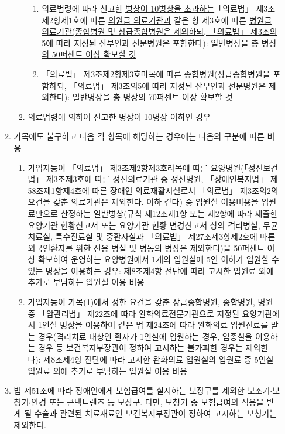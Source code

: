 \begin{enumerate}[1.]
\begin{enumerate}[가.]
\begin{enumerate}[(1)]
     		\begin{enumerate}[(가)]\tightlist
     		\item 의료법령에 따라 신고한 \uline{병상이 10병상을 초과하는}「의료법」 제3조제2항제1호에 따른 \uline{의원급 의료기관과} 같은 항 제3호에 따른 \uline{병원급 의료기관(종합병원 및 상급종합병원은 제외하되, 「의료법」 제3조의5에 따라 지정된 산부인과 전문병원은 포함한다)}: \uline{일반병상을 총 병상의 50퍼센트 이상 확보할 것}
     		\item 「의료법」 제3조제2항제3호마목에 따른 종합병원(상급종합병원을 포함하되, 「의료법」 제3조의5에 따라 지정된 산부인과 전문병원은 제외한다): 일반병상을 총 병상의 70퍼센트 이상 확보할 것
     		\end{enumerate}
   		\item 의료법령에 의하여 신고한 병상이 10병상 이하인 경우
   		\end{enumerate}
	\item 가목에도 불구하고 다음 각 항목에 해당하는 경우에는 다음의 구분에 따른 비용 
    		\begin{enumerate}[(1)]\tightlist
    		\item 가입자등이 「의료법」 제3조제2항제3호라목에 따른 요양병원(「정신보건법」 제3조제3호에 따른 정신의료기관 중 정신병원, 「장애인복지법」 제58조제1항제4호에 따른 장애인 의료재활시설로서 「의료법」 제3조의2의 요건을 갖춘 의료기관은 제외한다. 이하 같다) 중 입원실 이용비용을 입원료만으로 산정하는 일반병상(규칙 제12조제1항 또는 제2항에 따라 제출한 요양기관 현황신고서 또는 요양기관 현황 변경신고서 상의 격리병실, 무균치료실, 특수진료실 및 중환자실과 「의료법」 제27조제3항제2호에 따른 외국인환자를 위한 전용 병실 및 병동의 병상은 제외한다)을 50퍼센트 이상 확보하여 운영하는 요양병원에서 1개의 입원실에 5인 이하가 입원할 수 있는 병상을 이용하는 경우: 제8조제4항 전단에 따라 고시한 입원료 외에 추가로 부담하는 입원실 이용 비용
    		\item 가입자등이 가목(1)에서 정한 요건을 갖춘 상급종합병원, 종합병원, 병원 중 「암관리법」 제22조에 따라 완화의료전문기관으로 지정된 요양기관에서 1인실 병상을 이용하여 같은 법 제24조에 따라 완화의료 입원진료를 받는 경우(격리치료 대상인 환자가 1인실에 입원하는 경우, 임종실을 이용하는 경우 등 보건복지부장관이 정하여 고시하는 불가피한 경우는 제외한다): 제8조제4항 전단에 따라 고시한 완화의료 입원실의 입원료 중 5인실 입원료 외에 추가로 부담하는 입원실 이용 비용
    		\end{enumerate}
	\item 법 제51조에 따라 장애인에게 보험급여를 실시하는 보장구를 제외한 보조기$\cdot$보청기$\cdot$안경 또는 콘택트렌즈 등 보장구. 다만, 보청기 중 보험급여의 적용을 받게 될 수술과 관련된 치료재료인 보건복지부장관이 정하여 고시하는 보청기는 제외한다.

\end{enumerate}
\end{enumerate}
